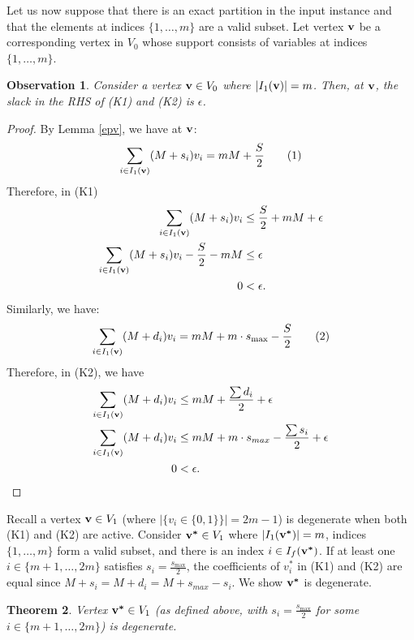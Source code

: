 \documentclass[10pt,a4paper]{amsart}
\newtheorem{theorem}{Theorem}[section]
\newtheorem{observation}[theorem]{Observation}
\def\ve#1{\mathchoice{\mbox{\boldmath$\displaystyle\bf#1$}}
{\mbox{\boldmath$\textstyle\bf#1$}}
{\mbox{\boldmath$\scriptstyle\bf#1$}}
{\mbox{\boldmath$\scriptscriptstyle\bf#1$}}}
\begin{document}
Let us now suppose that there is an exact partition in the input instance and that the elements at indices $\{1,\dots,m\}$ are a valid subset. Let vertex $\ve{v}$ be a corresponding vertex in $V_0$ whose support consists of variables at indices $\{1,\dots,m\}$. 
\begin{observation}\label{obs}
    Consider a vertex $\ve{v} \in V_0$ where $|I_1(\ve{v})|=m$. Then, at $\ve{v}$, the slack in the RHS of (K1) and (K2) is $\epsilon$.
\end{observation}
\begin{proof}
By Lemma \ref{epv}, we have at $\ve{v}$:
\begin{align*}
    \sum_{i \in I_1(\ve{v})}(M+s_i)v_i = mM +\frac{S}{2} \tag{1}
\end{align*}
Therefore, in (K1)
\begin{align*}
    \sum_{i \in I_1(\ve{v})}(M+s_i)v_i &\leq  \frac{S}{2} + mM + \epsilon\\
    \sum_{i \in I_1(\ve{v})}(M+s_i)v_i - \frac{S}{2} - mM &\leq \epsilon\\
    0 &< \epsilon. %
\end{align*}
Similarly, we have:
\begin{equation*}
    \sum_{i \in I_1(\ve{v})}(M+d_i)v_i = mM + m\cdot s_{\max} - \frac{S}{2} \tag{2}
\end{equation*}
Therefore, in (K2), we have
\begin{align*}
    \sum_{i \in I_1(\ve{v})}(M+d_i)v_i &\leq mM+ \frac{\sum d_i}{2}+ \epsilon\\
    \sum_{i \in I_1(\ve{v})}(M+d_i)v_i &\leq mM + m\cdot s_{max} - \frac{\sum s_i}{2}+\epsilon\\ 
    0 &< \epsilon. %
\end{align*}

\end{proof}

Recall a vertex $\ve{v} \in V_1$ (where $|\{v_i \in \{0,1\}\}| = 2m-1$) is degenerate when both (K1) and (K2) are active. Consider $\ve{v^*} \in V_1$ where $|I_1(\ve{v^*})| = m$, indices $\{1,\dots,m\}$ form a valid subset, and there is an index $i \in I_f(\ve{v^*})$. If at least one $i \in \{m+1,\dots, 2m\}$ satisfies $s_i = \frac{s_{\max}}{2}$, the coefficients of $v^*_i$ in (K1) and (K2) are equal since $M+s_i = M + d_i = M+s_{max} - s_i$. We show $\ve{v^*}$ is degenerate.


\begin{theorem}
    Vertex $\ve{v^*} \in V_1$ (as defined above, with $s_i = \frac{s_{\max}}{2}$ for some $i \in \{m+1,\ldots,2m\}$) is degenerate.
\end{theorem}
\end{document}
